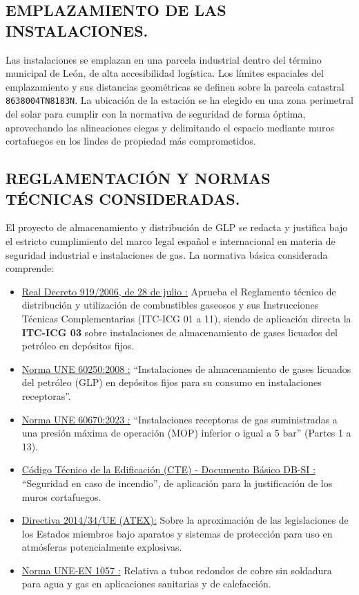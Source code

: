 \documentclass[12pt]{article}
\begin{document}
        \subsection{EMPLAZAMIENTO DE LAS INSTALACIONES.}
        Las instalaciones se emplazan en una parcela industrial dentro del término municipal de León, de alta accesibilidad logística. Los límites espaciales del emplazamiento y sus distancias geométricas se definen sobre la parcela catastral \texttt{8638004TN8183N}. La ubicación de la estación se ha elegido en una zona perimetral del solar para cumplir con la normativa de seguridad de forma óptima, aprovechando las alineaciones ciegas y delimitando el espacio mediante muros cortafuegos en los lindes de propiedad más comprometidos.

        \clearpage
        \subsection{REGLAMENTACIÓN Y NORMAS TÉCNICAS CONSIDERADAS.}
        El proyecto de almacenamiento y distribución de GLP se redacta y justifica bajo el estricto cumplimiento del marco legal español e internacional en materia de seguridad industrial e instalaciones de gas. La normativa básica considerada comprende:
        
        \begin{itemize}
            \item \underline{Real Decreto 919/2006, de 28 de julio \cite{rd919}:} Aprueba el Reglamento técnico de distribución y utilización de combustibles gaseosos y sus Instrucciones Técnicas Complementarias (ITC-ICG 01 a 11), siendo de aplicación directa la \textbf{ITC-ICG 03} sobre instalaciones de almacenamiento de gases licuados del petróleo en depósitos fijos.
            \item \underline{Norma UNE 60250:2008 \cite{une60250}:} ``Instalaciones de almacenamiento de gases licuados del petróleo (GLP) en depósitos fijos para su consumo en instalaciones receptoras''.
            \item \underline{Norma UNE 60670:2023 \cite{une60670}:} ``Instalaciones receptoras de gas suministradas a una presión máxima de operación (MOP) inferior o igual a $5\text{ bar}$'' (Partes 1 a 13).
            \item \underline{Código Técnico de la Edificación (CTE) - Documento Básico DB-SI \cite{rd314}:} ``Seguridad en caso de incendio'', de aplicación para la justificación de los muros cortafuegos.
            \item \underline{Directiva 2014/34/UE (ATEX):} Sobre la aproximación de las legislaciones de los Estados miembros bajo aparatos y sistemas de protección para uso en atmósferas potencialmente explosivas.
            \item \underline{Norma UNE-EN 1057 \cite{une1057}:} Relativa a tubos redondos de cobre sin soldadura para agua y gas en aplicaciones sanitarias y de calefacción.
        \end{itemize}
\end{document}
